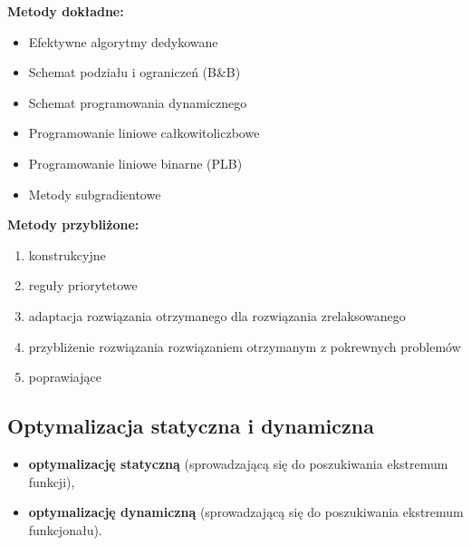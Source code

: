 \documentclass[10pt, a
4paper]{article}
\begin{document}
\newpage
\textbf{Metody dokładne:}
\begin{itemize}
\item Efektywne algorytmy dedykowane
\item Schemat podziału i ograniczeń (B\&B)
\item Schemat programowania dynamicznego
\item Programowanie liniowe całkowitoliczbowe
\item Programowanie liniowe binarne (PLB)
\item Metody subgradientowe
\end{itemize}
\textbf{Metody przybliżone:}
\begin{enumerate}
\item konstrukcyjne
\item reguły priorytetowe
\item adaptacja rozwiązania otrzymanego dla rozwiązania zrelaksowanego
\item przybliżenie rozwiązania rozwiązaniem otrzymanym z pokrewnych problemów
\item poprawiające
\end{enumerate}


\subsection{Optymalizacja statyczna i dynamiczna}
\begin{itemize}
\item \textbf{optymalizację statyczną} (sprowadzającą się do poszukiwania ekstremum funkcji),
\item \textbf{optymalizację dynamiczną} (sprowadzającą się do poszukiwania ekstremum funkcjonału).
\end{itemize}
\end{document}
